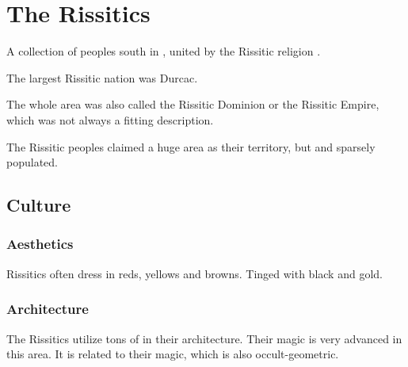 \chapter{The Rissitics}
A collection of peoples south in , united by the Rissitic religion . 

The largest Rissitic nation was Durcac. 

The whole area was also called the Rissitic Dominion or the Rissitic Empire, which was not always a fitting description.

The Rissitic peoples claimed a huge area as their territory, but  and sparsely populated. 















\section{Culture}









\subsection{Aesthetics}
Rissitics often dress in reds, yellows and browns. 
Tinged with black and gold.









\subsection{Architecture}
The Rissitics utilize tons of  in their architecture. 
Their magic is very advanced in this area. 
It is related to their  magic, which is also occult-geometric. 





